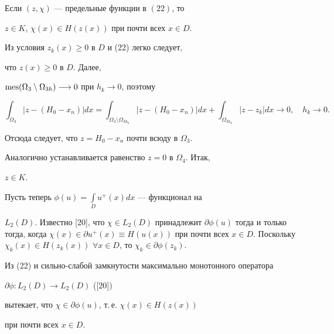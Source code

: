 \begin{lem}


Если $(z, \chi)$ --- предельные функции в $(22)$, то


$z\in K$, $\chi(x) \in H(z(x))$ при почти всех $x \in D$.


\end{lem}





\begin{pf}


Из условия $z_k(x) \geq 0$ в $D$ и (22) легко следует,


что $z(x) \geq 0$ в $D$. Далее,


$\mes(\Omega_3 \setminus \Omega_{3h}) \longrightarrow 0$ при $h_k


\longrightarrow 0$, поэтому


$$


\int_{\Omega_3}|z - (H_0 -x_n)| dx = \int_{\Omega_3 \setminus


\Omega_{3h_k}}|z - (H_0 -x_n)| dx +


\int_{\Omega_{3h_k}}|z - z_k| dx \longrightarrow 0,


\quad h_k \longrightarrow 0.


$$


Отсюда следует, что $z = H_0 - x_n$ почти всюду в $\Omega_3$.


Аналогично устанавливается равенство $z = 0$ в $\Omega_4$. Итак,


$z\in K$.





Пусть теперь $\phi(u) = \int\limits_D u^+(x) dx$ --- функционал на


$L_2(D)$. Известно [20], что $\chi \in L_2(D)$ принадлежит $\partial


\phi(u)$ тогда и только тогда, когда $\chi(x) \in \partial u^+(x)


\equiv H(u(x))$ при почти всех $x \in D$. Поскольку $\chi_k(x)


\in H(z_k(x))$ $\forall x \in D$, то $\chi_k \in \partial \phi (z_k)$.


Из (22) и сильно-слабой замкнутости максимально монотонного оператора


$ \partial \phi: L_2(D) \longrightarrow L_2(D)$ ([20])


вытекает, что $\chi \in \partial \phi(u)$, т.\,е. $\chi(x) \in H(z(x))$


при почти всех $x \in D$.


\end{pf}





